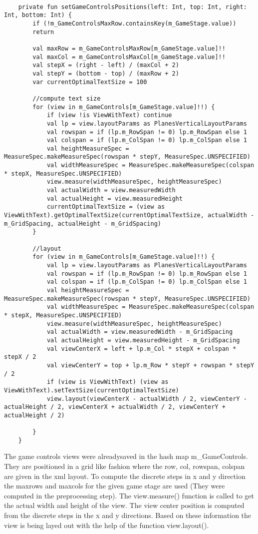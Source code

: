 \begin{lstlisting}

	private fun setGameControlsPositions(left: Int, top: Int, right: Int, bottom: Int) {
		if (!m_GameControlsMaxRow.containsKey(m_GameStage.value))
		return
		
		val maxRow = m_GameControlsMaxRow[m_GameStage.value]!!
		val maxCol = m_GameControlsMaxCol[m_GameStage.value]!!
		val stepX = (right - left) / (maxCol + 2)
		val stepY = (bottom - top) / (maxRow + 2)
		var currentOptimalTextSize = 100
		
		//compute text size
		for (view in m_GameControls[m_GameStage.value]!!) {
			if (view !is ViewWithText) continue
			val lp = view.layoutParams as PlanesVerticalLayoutParams
			val rowspan = if (lp.m_RowSpan != 0) lp.m_RowSpan else 1
			val colspan = if (lp.m_ColSpan != 0) lp.m_ColSpan else 1
			val heightMeasureSpec = MeasureSpec.makeMeasureSpec(rowspan * stepY, MeasureSpec.UNSPECIFIED)
			val widthMeasureSpec = MeasureSpec.makeMeasureSpec(colspan * stepX, MeasureSpec.UNSPECIFIED)
			view.measure(widthMeasureSpec, heightMeasureSpec)
			val actualWidth = view.measuredWidth
			val actualHeight = view.measuredHeight
			currentOptimalTextSize = (view as ViewWithText).getOptimalTextSize(currentOptimalTextSize, actualWidth - m_GridSpacing, actualHeight - m_GridSpacing)
		}
		
		//layout
		for (view in m_GameControls[m_GameStage.value]!!) {
			val lp = view.layoutParams as PlanesVerticalLayoutParams
			val rowspan = if (lp.m_RowSpan != 0) lp.m_RowSpan else 1
			val colspan = if (lp.m_ColSpan != 0) lp.m_ColSpan else 1
			val heightMeasureSpec = MeasureSpec.makeMeasureSpec(rowspan * stepY, MeasureSpec.UNSPECIFIED)
			val widthMeasureSpec = MeasureSpec.makeMeasureSpec(colspan * stepX, MeasureSpec.UNSPECIFIED)
			view.measure(widthMeasureSpec, heightMeasureSpec)
			val actualWidth = view.measuredWidth - m_GridSpacing
			val actualHeight = view.measuredHeight - m_GridSpacing
			val viewCenterX = left + lp.m_Col * stepX + colspan * stepX / 2
			val viewCenterY = top + lp.m_Row * stepY + rowspan * stepY / 2
			if (view is ViewWithText) (view as ViewWithText).setTextSize(currentOptimalTextSize)
			view.layout(viewCenterX - actualWidth / 2, viewCenterY - actualHeight / 2, viewCenterX + actualWidth / 2, viewCenterY + actualHeight / 2)
			
		}
	}

\end{lstlisting}

The game controls views were alreadysaved in the hash map m\_GameControls. They are positioned in a grid like fashion where the row, col, rowspan, colspan are given in the xml layout. To compute the discrete steps in x and y direction the maxrows and maxcols for the given game stage are used (They were computed in the preprocessing step). The view.measure() function is called to get the actual width and height of the view. The view center position is computed from the discrete steps in the x and y directions. Based on these information the view is being layed out with the help of the function view.layout().

